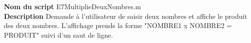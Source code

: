 \textbf{Nom du script}
E7MultiplieDeuxNombres.m\\
\textbf{Description}
Demande à l'utilisateur de saisir deux nombres et affiche le produit des deux nombres. L'affichage prends la forme "NOMBRE1 x NOMBRE2 = PRODUIT" suivi d'un saut de ligne.